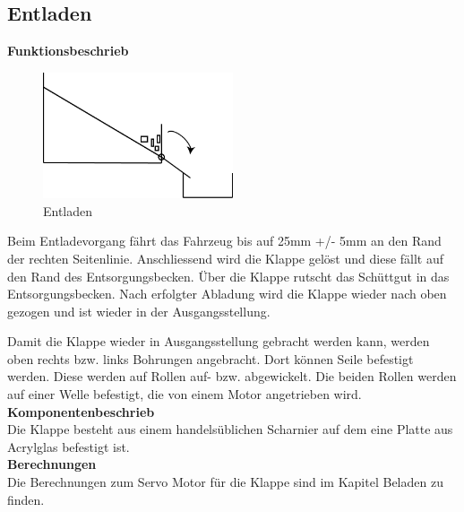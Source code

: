 \subsection{Entladen}

\textbf{Funktionsbeschrieb}\\[0.2cm]
\begin{figure}[H]
\centering
\includegraphics[width=0.5\textwidth]{03_Loesungskonzept/pictures/Entladen_Schraegbehaelter.png}
\caption{Entladen}
\end{figure}\flushleft

Beim Entladevorgang fährt das Fahrzeug bis auf 25mm +/- 5mm an den Rand der rechten Seitenlinie. Anschliessend wird die Klappe gelöst und diese fällt auf den Rand des Entsorgungsbecken. Über die Klappe rutscht das Schüttgut in das Entsorgungsbecken. Nach erfolgter Abladung wird die Klappe wieder nach oben gezogen und ist wieder in der Ausgangsstellung.

Damit die Klappe wieder in Ausgangsstellung gebracht werden kann, werden oben rechts bzw. links Bohrungen angebracht. Dort können Seile befestigt werden. Diese werden auf Rollen auf- bzw. abgewickelt. Die beiden Rollen werden auf einer Welle befestigt, die von einem Motor angetrieben wird.\\[0.2cm]

\textbf{Komponentenbeschrieb}\\[0.2cm]
Die Klappe besteht aus einem handelsüblichen Scharnier auf dem eine Platte aus Acrylglas befestigt ist. \\[0.2cm]

\textbf{Berechnungen}\\[0.2cm]
Die Berechnungen zum Servo Motor für die Klappe sind im Kapitel Beladen zu finden. 